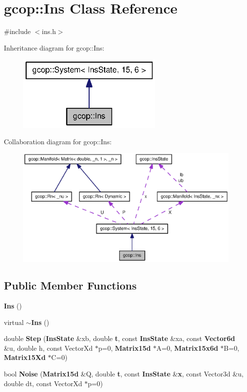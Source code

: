 \section{gcop\-:\-:\-Ins \-Class \-Reference}
\label{classgcop_1_1Ins}


{\ttfamily \#include $<$ins.\-h$>$}



\-Inheritance diagram for gcop\-:\-:\-Ins\-:\nopagebreak
\begin{figure}[H]
\begin{center}
\leavevmode
\includegraphics[width=204pt]{classgcop_1_1Ins__inherit__graph}
\end{center}
\end{figure}


\-Collaboration diagram for gcop\-:\-:\-Ins\-:\nopagebreak
\begin{figure}[H]
\begin{center}
\leavevmode
\includegraphics[width=350pt]{classgcop_1_1Ins__coll__graph}
\end{center}
\end{figure}
\subsection*{\-Public \-Member \-Functions}
\begin{DoxyCompactItemize}
\item 
{\bf \-Ins} ()
\item 
virtual {\bf $\sim$\-Ins} ()
\item 
double {\bf \-Step} ({\bf \-Ins\-State} \&xb, double {\bf t}, const {\bf \-Ins\-State} \&xa, const {\bf \-Vector6d} \&u, double h, const \-Vector\-Xd $\ast$p=0, {\bf \-Matrix15d} $\ast$\-A=0, {\bf \-Matrix15x6d} $\ast$\-B=0, {\bf \-Matrix15\-Xd} $\ast$\-C=0)
\item 
bool {\bf \-Noise} ({\bf \-Matrix15d} \&\-Q, double {\bf t}, const {\bf \-Ins\-State} \&{\bf x}, const \-Vector3d \&u, double dt, const \-Vector\-Xd $\ast$p=0)
\end{DoxyCompactItemize}
